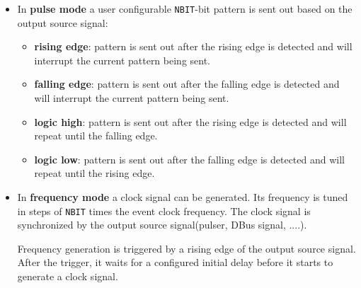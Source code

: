 \documentclass[12pt,a4paper]{article}
\begin{document}
\begin{itemize}
\item 
	In \textbf{pulse mode} a user configurable \texttt{NBIT}-bit pattern is sent out based on the output source signal:
	
	\begin{itemize}
		\item
		  \textbf{rising edge}: pattern is sent out
		  after the rising edge is detected and will interrupt the current
		  pattern being sent.
		\item
		  \textbf{falling edge}: pattern is sent out
		  after the falling edge is detected and will interrupt the current
		  pattern being sent.
		\item
		  \textbf{logic high}: pattern is sent out after
		  the rising edge is detected and will repeat until the falling edge.
		\item
		  \textbf{logic low}: pattern is sent out after
		  the falling edge is detected and will repeat until the rising edge.
		\end{itemize}
	
\item 
	In \textbf{frequency mode} a clock signal can be generated. Its frequency is tuned in steps of \texttt{NBIT} times the event clock frequency.  The clock signal is synchronized by the output source signal(pulser, DBus signal, ....). 
	
	Frequency generation is triggered by a rising edge of the output source signal. After the trigger, it waits for a configured initial delay before it starts to generate a clock signal. 
		

\end{itemize}
\end{document}
